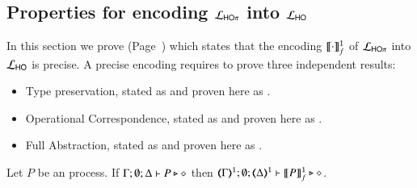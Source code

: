 
\subsection{Properties for encoding $\mathcal{L}_{\mathsf{HO}\pi}$ into $\mathcal{L}_{\mathsf{HO}}$}
\label{app:enc_HOp_to_HO}


In this section we prove  (Page~\pageref{f:enc:hopitoho})
which states that the encoding $\llbracket\cdot\rrbracket^\mathtt{1}_f$ of 
$\mathcal{L}_{\mathsf{HO}\pi}$ into $\mathcal{L}_{\mathsf{HO}}$ is precise.
A precise encoding requires to prove three independent results:
\begin{itemize}
	\item	Type preservation, stated as 
	and proven here as  .
	\item	Operational Correspondence, 
	stated as  and proven here as
	  .
	\item	Full Abstraction, stated as  and proven here as .
\end{itemize}


\begin{proposition}
	\label{app:prop:typepres_HOp_to_HO}
	Let $P$ be an \HOp process.
	If $\Gamma; \emptyset; \Delta \vdash P \triangleright \diamond$ then 
	$\tmap{\Gamma}{1}; \emptyset; \tmap{\Delta}{1} \proves \pmapp{P}{1}{f} \hastype \Proc$. 
\end{proposition}

